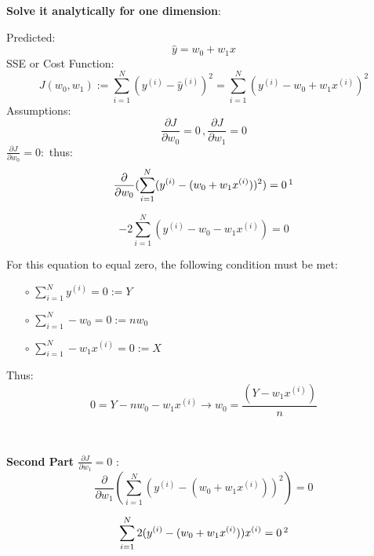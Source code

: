 \documentclass{article}
\newenvironment{cheatformula}[1][כותרת]{
    \begin{minipage}{\linewidth}
    \textbf{#1}:
}{
    \end{minipage}\\[2ex]
}
\begin{document}
\begin{multicols*}{2}
\begin{cheatformula}[Solve it analytically for one dimension]
Predicted:
\begin{equation}
\widehat{y} = w_{0} + w_{1}x
\end{equation}
SSE or Cost Function:
\begin{equation}
J(w_{0}, w_{1}) := \sum_{i=1}^{N}(y^{(i)} - \widehat{y}^{(i)})^{2} = \sum_{i=1}^{N}(y^{(i)} -  w_{0} + w_{1}x^{(i)})^{2}
\end{equation}
Assumptions:
\begin{equation}
\frac{\partial J}{\partial w_{0}} = 0 \,, \frac{\partial J}{\partial w_{1}} = 0
\end{equation}
$\frac{\partial J}{\partial w_{0}} = 0:$ thus:
\begin{equation}
\frac{\partial }{\partial w_{0}}  ( \sum_{i=1}^{N}(y^{(i)} -  (w_{0} + w_{1}x^{(i)}))^{2}) = 0  \, \footnotemark
\end{equation}

\begin{equation}
-2 \sum_{i=1}^{N}(y^{(i)} -  w_{0} - w_{1}x^{(i)}) = 0
\end{equation}

For this equation to equal zero, the following condition must be met:
\begin{itemize}
\item[$\circ$] $\sum_{i=1}^{N}y^{(i)} = 0 := Y$ 
\item[$\circ$] $\sum_{i=1}^{N}-w_{0}  = 0 := n w_{0} $ 
\item[$\circ$] $\sum_{i=1}^{N}-w_{1}x^{(i)}  = 0 := X $ 
\end{itemize}
Thus:
\begin{equation}
0 = Y - n w_{0} -w_{1}x^{(i)} \longrightarrow  w_{0} = \frac{(Y -w_{1}x^{(i)})}{n}
\end{equation}
\end{cheatformula}


\begin{cheatformula}[Second Part $\frac{\partial J}{\partial w_{1}} = 0$ ]\\

\begin{equation}
\frac{\partial }{\partial w_{1}}  ( \sum_{i=1}^{N}(y^{(i)} -  (w_{0} + w_{1}x^{(i)}))^{2}) = 0
\end{equation}

\begin{equation}
\sum_{i=1}^{N} 2(y^{(i)} -  (w_{0} + w_{1}x^{(i)})) x^{(i)} = 0  \, \footnotemark
\end{equation}


\end{cheatformula}
\end{multicols*}
\end{document}
